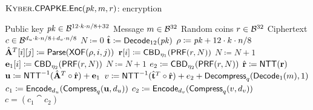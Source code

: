 \begin{algorithm}
  \caption{$\text{{\sc Kyber}}.{\sf CPAPKE}.\mathsf{Enc}(\mathit{pk}, m, r)$: encryption
  \label{kybercpa-enc}}
  \begin{algorithmic}[1]
    \Require Public key $\mathit{pk} \in \mathcal{B}^{12\cdot k\cdot n/8 + 32}$
    \Require Message $m \in \mathcal{B}^{32}$
    \Require Random coins $r \in \mathcal{B}^{32}$
    \Ensure Ciphertext $c \in \mathcal{B}^{d_u\cdot k\cdot n/8 + d_v\cdot n/8}$
    \State $N \coloneqq 0$
    \State $\hat{\mathbf{t}} \coloneqq \mathsf{Decode}_{12}(\mathit{pk})$
    \State $\rho \coloneqq \mathit{pk}+12\cdot k\cdot n/8$
               
      \State $\hat{\mathbf{A}}^T[i][j] \coloneqq \mathsf{Parse}(\mathsf{XOF}(\rho, i, j))$     
    \EndFor
    \EndFor
    \label{line:kybercpa-enc:rpo}       
      \State $\mathbf{r}[i] \coloneqq \mathsf{CBD}_{\eta_1}(\mathsf{PRF}(r, N))$
      \State $N \coloneqq N+1$
    \EndFor
    \label{line:kybercpa-enc:epo}       
      \State $\mathbf{e}_1[i] \coloneqq \mathsf{CBD}_{\eta_2}(\mathsf{PRF}(r, N))$
      \State $N \coloneqq N+1$
    \EndFor
    \State $e_2 \coloneqq \mathsf{CBD}_{\eta_2}(\mathsf{PRF}(r, N))$                 
    \State $\hat{\mathbf{r}} \coloneqq \mbox{\textsf{NTT}}(\mathbf{r})$\label{line:kybercpa-enc:nttr}
    \State $\mathbf{u} \coloneqq \mbox{\textsf{NTT}}^{-1}(\hat{\mathbf{A}}^T \circ \hat{\mathbf{r}}) + \mathbf{e}_1$\label{line:kybercpa-enc:invnttar} 
    \State $v \coloneqq \mbox{\textsf{NTT}}^{-1}(\hat{\mathbf{t}}^T\circ\hat{\mathbf{r}}) + e_2 + \mathsf{Decompress}_q(\mathsf{Decode}_1(m),1)$ \label{line:kybercpa-enc:v} 
    \State $c_1 \coloneqq \mathsf{Encode}_{d_u}(\mathsf{Compress}_q(\mathbf{u}, d_u))$
    \State $c_2 \coloneqq \mathsf{Encode}_{d_v}(\mathsf{Compress}_q(v, d_v))$
    \State \Return $c = (c_1\cat c_2)$ 
  \end{algorithmic}
\end{algorithm}

